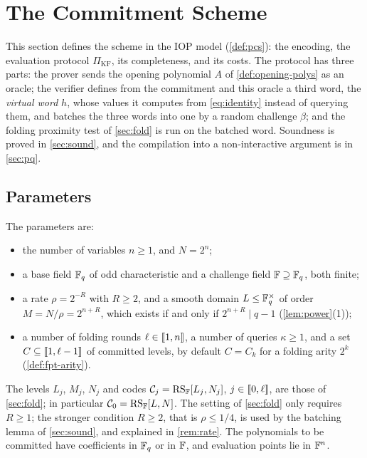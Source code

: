 \section{The Commitment Scheme}\label{sec:scheme}

This section defines the scheme in the IOP model (\cref{def:pcs}): the encoding, the evaluation protocol $\Pi_{\mathrm{KF}}$, its completeness, and its costs.
The protocol has three parts: the prover sends the opening polynomial $A$ of \cref{def:opening-polys} as an oracle; the verifier defines from the commitment and this oracle a third word, the \emph{virtual word} $h$, whose values it computes from \eqref{eq:identity} instead of querying them, and batches the three words into one by a random challenge $\beta$; and the folding proximity test of \cref{sec:fold} is run on the batched word.
Soundness is proved in \cref{sec:sound}, and the compilation into a non-interactive argument is in \cref{sec:pq}.

\subsection{Parameters}\label{sec:scheme:params}

The parameters are:
\begin{itemize}
  \item the number of variables $n \ge 1$, and $N = 2^n$;
  \item a base field $\mathbb{F}_q$ of odd characteristic and a challenge field $\mathbb{F} \supseteq \mathbb{F}_q$, both finite;
  \item a rate $\rho = 2^{-R}$ with $R \ge 2$, and a smooth domain $L \le \mathbb{F}_q^\times$ of order $M = N/\rho = 2^{n+R}$, which exists if and only if $2^{n+R} \mid q-1$ (\cref{lem:power}(1));
  \item a number of folding rounds $\ell \in \llbracket 1, n \rrbracket$, a number of queries $\kappa \ge 1$, and a set $C \subseteq \llbracket 1, \ell-1 \rrbracket$ of committed levels, by default $C = C_k$ for a folding arity $2^k$ (\cref{def:fpt-arity}).
\end{itemize}
The levels $L_j$, $M_j$, $N_j$ and codes $\mathcal{C}_j = \mathrm{RS}_{\mathbb{F}}[L_j,N_j]$, $j \in \llbracket 0, \ell \rrbracket$, are those of \cref{sec:fold}; in particular $\mathcal{C}_0 = \mathrm{RS}_{\mathbb{F}}[L,N]$.
The setting of \cref{sec:fold} only requires $R \ge 1$; the stronger condition $R \ge 2$, that is $\rho \le 1/4$, is used by the batching lemma of \cref{sec:sound}, and explained in \cref{rem:rate}.
The polynomials to be committed have coefficients in $\mathbb{F}_q$ or in $\mathbb{F}$, and evaluation points lie in $\mathbb{F}^n$.

